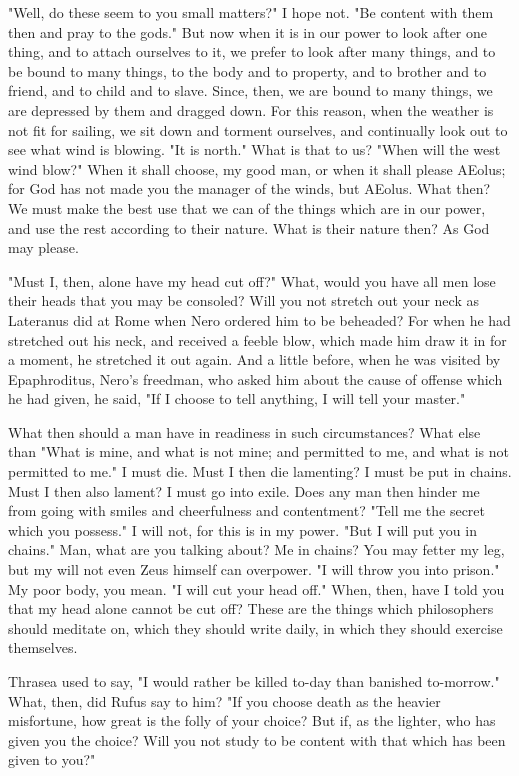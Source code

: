 \documentclass[a4paper]{article}
\begin{document}
"Well, do these seem to you small matters?" I hope not. "Be content
with them then and pray to the gods." But now when it is in our power
to look after one thing, and to attach ourselves to it, we prefer
to look after many things, and to be bound to many things, to the
body and to property, and to brother and to friend, and to child and
to slave. Since, then, we are bound to many things, we are depressed
by them and dragged down. For this reason, when the weather is not
fit for sailing, we sit down and torment ourselves, and continually
look out to see what wind is blowing. "It is north." What is that
to us? "When will the west wind blow?" When it shall choose, my good
man, or when it shall please AEolus; for God has not made you the
manager of the winds, but AEolus. What then? We must make the best
use that we can of the things which are in our power, and use the
rest according to their nature. What is their nature then? As God
may please. 

"Must I, then, alone have my head cut off?" What, would you have all
men lose their heads that you may be consoled? Will you not stretch
out your neck as Lateranus did at Rome when Nero ordered him to be
beheaded? For when he had stretched out his neck, and received a feeble
blow, which made him draw it in for a moment, he stretched it out
again. And a little before, when he was visited by Epaphroditus, Nero's
freedman, who asked him about the cause of offense which he had given,
he said, "If I choose to tell anything, I will tell your master."

What then should a man have in readiness in such circumstances? What
else than "What is mine, and what is not mine; and permitted to me,
and what is not permitted to me." I must die. Must I then die lamenting?
I must be put in chains. Must I then also lament? I must go into exile.
Does any man then hinder me from going with smiles and cheerfulness
and contentment? "Tell me the secret which you possess." I will not,
for this is in my power. "But I will put you in chains." Man, what
are you talking about? Me in chains? You may fetter my leg, but my
will not even Zeus himself can overpower. "I will throw you into prison."
My poor body, you mean. "I will cut your head off." When, then, have
I told you that my head alone cannot be cut off? These are the things
which philosophers should meditate on, which they should write daily,
in which they should exercise themselves. 

Thrasea used to say, "I would rather be killed to-day than banished
to-morrow." What, then, did Rufus say to him? "If you choose death
as the heavier misfortune, how great is the folly of your choice?
But if, as the lighter, who has given you the choice? Will you not
study to be content with that which has been given to you?"
\end{document}

